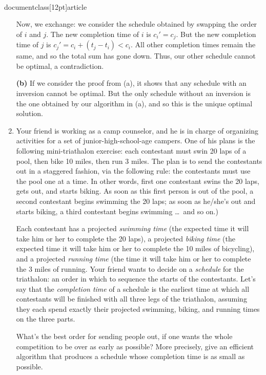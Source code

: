 \\documentclass[12pt]{article}
\begin{document}
\begin{enumerate}
{Now, we exchange: we consider the schedule obtained by
swapping the order of $i$ and $j$.
The new completion time of $i$ is $c_i' = c_j$.
But the new completion time of $j$ is 
$c_j' = c_i + (t_j - t_i) < c_i$.
All other completion times remain the same, and so
the total sum has gone down.
Thus, our other schedule cannot be optimal, a contradiction.

{\bf (b)} If we consider the proof from (a), it shows 
that any schedule with an inversion cannot be optimal.
But the only schedule without an inversion is the one
obtained by our algorithm in (a), and so this
is the unique optimal solution.

}


\item 

Your friend is working as a camp counselor, and he
is in charge of organizing activities for a set of
junior-high-school-age campers.
One of his plans is the following mini-triathalon exercise:
each contestant must swin 20 laps of a pool, then bike 10 miles,
then run 3 miles.
The plan is to send the contestants out in a staggered fashion,
via the following rule: the contestants must use the pool
one at a time.
In other words, first one contestant swins the 20 laps,
gets out, and starts biking.
As soon as this first person is out of the pool,
a second contestant begins swimming the 20 laps;
as soon as he/she's out and starts biking, a third
contestant begins swimming \ldots\ and so on.)

Each contestant has a projected {\em swimming time}
(the expected time it will take him or her to complete the 20 laps),
a projected {\em biking time}
(the expected time it will take him or her to complete the
10 miles of bicycling),
and a projected {\em running time}
(the time it will take him or her to complete the 3 miles of running.
Your friend wants to decide on a {\em schedule} for the triathalon:
an order in which to sequence the starts of the contestants.
Let's say that the {\em completion time} of a schedule
is the earliest time at which all contestants will be finished
with all three legs of the triathalon,
assuming they each spend exactly their projected
swimming, biking, and running times on the three parts.

What's the best order for sending people out, if
one wants the whole competition to be over as early as possible?
More precisely, give an efficient algorithm that produces a schedule
whose completion time is as small as possible.


\end{enumerate}
\end{document}

